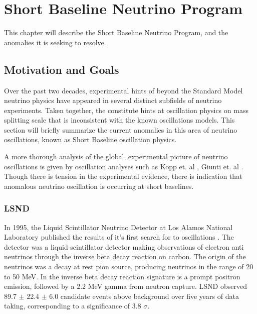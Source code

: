 \chapter{Short Baseline Neutrino Program}
\label{chp:sbn}

This chapter will describe the Short Baseline Neutrino Program, and the anomalies it is seeking to resolve.

\section{Motivation and Goals}

Over the past two decades, experimental hints of beyond the Standard Model neutrino physics have appeared in several distinct subfields of neutrino experiments.  Taken together, the constitute hints at oscillation physics on mass splitting scale that is inconsistent with the known oscillations models.  This section will briefly summarize the current anomalies in this area of neutrino oscillations, known as Short Baseline oscillation physics.

A more thorough analysis of the global, experimental picture of neutrino oscillations is given by oscillation analyses such as Kopp et. al \cite{Kopp:2013vaa}, Giunti et. al \cite{Giunti:2013aea}.  Though there is tension in the experimental evidence, there is indication that anomalous neutrino oscillation is occurring at short baselines.


\subsection{LSND}

In 1995, the Liquid Scintillator Neutrino Detector at Los Alamos National Laboratory published the results of it's first search for \numubar to \nuebar oscillations \cite{Athanassopoulos:1995iw}.  The detector was a liquid scintillator detector making observations of electron anti neutrinos through the inverse beta decay reaction on carbon.  The origin of the neutrinos was a decay at rest pion source, producing neutrinos in the range of 20 to 50 MeV.  In the inverse beta decay reaction signature is a prompt positron emission, followed by a 2.2 MeV gamma from neutron capture.   LSND observed 89.7 $\pm$ 22.4 $\pm$ 6.0 \nuebar candidate events above background over five years of data taking, corresponding to a significance of 3.8 $\sigma$.


